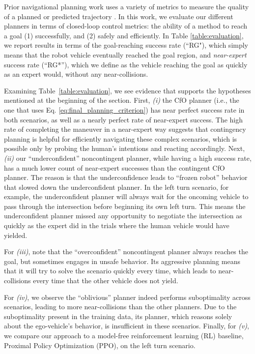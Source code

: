 \documentclass[conference]{IEEEtran}
\newcommand{\ours}[0]{{CfO}}
\begin{document}
Prior navigational planning work uses a variety of metrics to measure the quality of a planned or predicted trajectory \citep{tang2019mfp,rhinehart2019precog}.
In this work, we evaluate our different planners in terms of closed-loop control metrics: the ability of a method to reach a goal (1) successfully, and (2) safely and efficiently.
In Table \ref{table:evaluation}, we report results in terms of the goal-reaching success rate (``RG"), which simply means that the robot vehicle eventually reached the goal region, and \emph{near-expert} success rate (``RG*''), which we define as the vehicle reaching the goal as quickly as an expert would, without any near-collisions.

Examining Table~\ref{table:evaluation}, we see evidence that supports the hypotheses mentioned at the beginning of the section.
First, \emph{(i)} the \ours{}
planner (i.e., the one that uses Eq. \ref{eq:final_planning_criterion}) has near perfect success rate in both scenarios, as well as a nearly perfect rate of near-expert success.
The high rate of completing the maneuver in a near-expert way suggests that contingency planning is helpful for efficiently navigating these complex scenarios, which is possible only by probing the human's intentions and reacting accordingly.
Next, \emph{(ii)} our ``underconfident'' noncontingent planner, while having a high success rate, has a much lower count of near-expert successes than the contingent \ours{} planner.
The reason is that the underconfidence leads to ``frozen robot'' behavior that slowed down the underconfident planner.
In the left turn scenario, for example, the underconfident planner will always wait for the oncoming vehicle to pass through the intersection before beginning its own left turn.
This means the underconfident planner missed any opportunity to negotiate the intersection as quickly as the expert did in the trials where the human vehicle would have yielded.

For \emph{(iii)}, note that the ``overconfident'' noncontingent planner always reaches the goal, but sometimes engages in unsafe behavior. Its aggressive planning means that it will try to solve the scenario quickly every time, which leads to near-collisions every time that the other vehicle does not yield.

For \emph{(iv)}, we observe the ``oblivious'' planner \cite{rhinehart2020deep} indeed performs suboptimality across scenarios, leading to more near-collisions than the other planners. Due to the suboptimality present in the training data, its planner, which reasons solely about the ego-vehicle's behavior, is insufficient in these scenarios.
Finally, for \emph{(v)}, we compare our approach to a model-free reinforcement learning (RL) baseline, Proximal Policy Optimization (PPO), on the left turn scenario.
\end{document}
